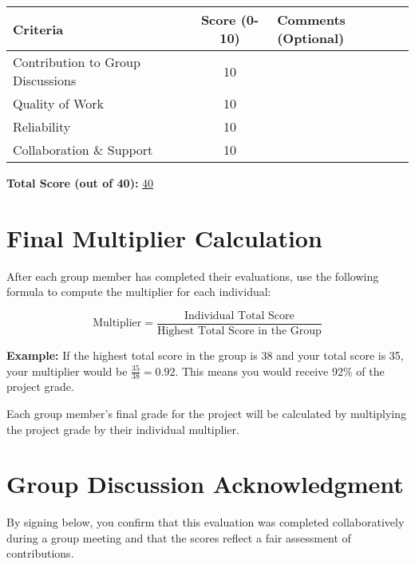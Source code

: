 \documentclass{article}
\begin{document}
\begin{tabular}{|l|c|p{7cm}|}
\hline
\textbf{Criteria} & \textbf{Score (0-10)} & \textbf{Comments (Optional)} \\ \hline
Contribution to Group Discussions & 10 & \\ \hline
Quality of Work & 10 & \\ \hline
Reliability & 10 & \\ \hline
Collaboration \& Support & 10 & \\ \hline
\end{tabular}

\vspace{0.5cm}
\textbf{Total Score (out of 40):} \underline{\hspace{0.5cm} 40}

\section*{Final Multiplier Calculation}

After each group member has completed their evaluations, use the following formula to compute the multiplier for each individual:

\[
\text{Multiplier} = \frac{\text{Individual Total Score}}{\text{Highest Total Score in the Group}}
\]

\textbf{Example:} If the highest total score in the group is 38 and your total score is 35, your multiplier would be \(\frac{35}{38} = 0.92\). This means you would receive 92\% of the project grade.

Each group member's final grade for the project will be calculated by multiplying the project grade by their individual multiplier.

\section*{Group Discussion Acknowledgment}

By signing below, you confirm that this evaluation was completed collaboratively during a group meeting and that the scores reflect a fair assessment of contributions.
\end{document}
